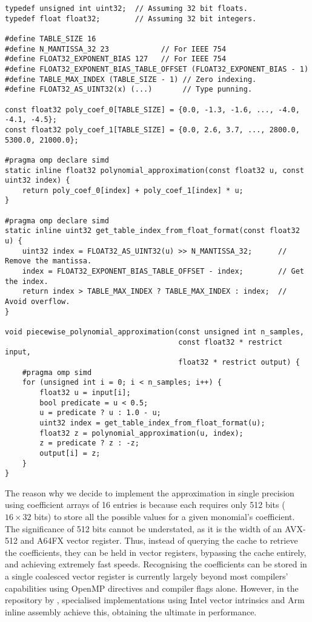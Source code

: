 \documentclass[manuscript,review]{acmart}
\begin{document}
\begin{lstfloat}[h!tb]
\begin{lstlisting}[style=C, caption={C implementation of the piecewise linear approximation.}, label={code:piecewise_linear_approximation}]
typedef unsigned int uint32;  // Assuming 32 bit floats. 
typedef float float32;        // Assuming 32 bit integers. 

#define TABLE_SIZE 16
#define N_MANTISSA_32 23            // For IEEE 754
#define FLOAT32_EXPONENT_BIAS 127   // For IEEE 754
#define FLOAT32_EXPONENT_BIAS_TABLE_OFFSET (FLOAT32_EXPONENT_BIAS - 1)
#define TABLE_MAX_INDEX (TABLE_SIZE - 1) // Zero indexing.
#define FLOAT32_AS_UINT32(x) (...)       // Type punning.

const float32 poly_coef_0[TABLE_SIZE] = {0.0, -1.3, -1.6, ..., -4.0, -4.1, -4.5};
const float32 poly_coef_1[TABLE_SIZE] = {0.0, 2.6, 3.7, ..., 2800.0, 5300.0, 21000.0};

#pragma omp declare simd
static inline float32 polynomial_approximation(const float32 u, const uint32 index) {
    return poly_coef_0[index] + poly_coef_1[index] * u;
}

#pragma omp declare simd
static inline uint32 get_table_index_from_float_format(const float32 u) {
    uint32 index = FLOAT32_AS_UINT32(u) >> N_MANTISSA_32;      // Remove the mantissa.
    index = FLOAT32_EXPONENT_BIAS_TABLE_OFFSET - index;        // Get the index.
    return index > TABLE_MAX_INDEX ? TABLE_MAX_INDEX : index;  // Avoid overflow.
}

void piecewise_polynomial_approximation(const unsigned int n_samples,
                                        const float32 * restrict input, 
                                        float32 * restrict output) {
    #pragma omp simd 
    for (unsigned int i = 0; i < n_samples; i++) {
        float32 u = input[i];
        bool predicate = u < 0.5;
        u = predicate ? u : 1.0 - u;
        uint32 index = get_table_index_from_float_format(u);
        float32 z = polynomial_approximation(u, index);
        z = predicate ? z : -z;
        output[i] = z;
    }
}
\end{lstlisting}
\end{lstfloat}

The reason why we decide to implement the approximation in single precision using coefficient arrays of 16 entries is because each requires only 512 bits ($ 16 \times 32 $ bits) to store all the possible values for a given monomial's coefficient. The significance of 512 bits cannot be understated, as it is the width of an AVX-512 and A64FX vector register. Thus, instead of querying the cache to retrieve the coefficients, they can be held in vector registers, bypassing the cache entirely, and achieving extremely fast speeds. Recognising the coefficients can be stored in a single coalesced vector register is currently largely beyond most compilers' capabilities using OpenMP directives and compiler flags alone. However, in the repository by \citet{sheridan2020approximate_random}, specialised implementations using Intel vector intrinsics and Arm inline assembly achieve this, obtaining the ultimate in performance. 
\end{document}
